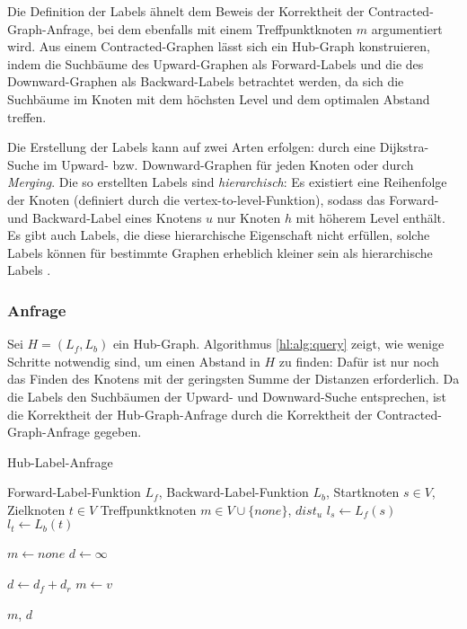 Die Definition der Labels ähnelt dem Beweis der Korrektheit der Contracted-Graph-Anfrage, bei dem ebenfalls mit einem Treffpunktknoten $m$ argumentiert wird.
Aus einem Contracted-Graphen lässt sich ein Hub-Graph konstruieren, indem die Suchbäume des Upward-Graphen als Forward-Labels und die des Downward-Graphen als Backward-Labels betrachtet werden, da sich die Suchbäume im Knoten mit dem höchsten Level und dem optimalen Abstand treffen.

Die Erstellung der Labels kann auf zwei Arten erfolgen: durch eine Dijkstra-Suche im Upward- bzw. Downward-Graphen für jeden Knoten oder durch \emph{Merging}.
Die so erstellten Labels sind \emph{hierarchisch}:
Es existiert eine Reihenfolge der Knoten (definiert durch die vertex-to-level-Funktion), sodass das Forward- und Backward-Label eines Knotens $u$ nur Knoten $h$ mit höherem Level enthält.
Es gibt auch Labels, die diese hierarchische Eigenschaft nicht erfüllen, solche Labels können für bestimmte Graphen erheblich kleiner sein als hierarchische Labels \cite{goldberg2013separating}.

\subsubsection{Anfrage}

Sei $H = (L_f, L_b)$ ein Hub-Graph.
Algorithmus \ref{hl:alg:query} zeigt, wie wenige Schritte notwendig sind, um einen Abstand in $H$ zu finden: Dafür ist nur noch das Finden des Knotens mit der geringsten Summe der Distanzen erforderlich.
Da die Labels den Suchbäumen der Upward- und Downward-Suche entsprechen, ist die Korrektheit der Hub-Graph-Anfrage durch die Korrektheit der Contracted-Graph-Anfrage gegeben.

\begin{algorithm}[ht]
  \caption{Hub-Label-Anfrage}
  \begin{algorithmic}[1]
    \Require Forward-Label-Funktion $L_f$, Backward-Label-Funktion $L_b$, Startknoten $s \in V$, Zielknoten $t \in V$
    \Ensure Treffpunktknoten $m \in V \cup \{ {none} \}$, ${dist}_u$
    \State $l_s \leftarrow L_f (s)$
    \State $l_t \leftarrow L_b (t)$

    \State
    \State $m \leftarrow {none}$
    \State $d \leftarrow \infty$

    \State $d \leftarrow d_f + d_r$
    \State $m \leftarrow v$
    \EndIf
    \EndFor

    \State
    \State \Return $m$, $d$
  \end{algorithmic}
  \label{hl:alg:query}
\end{algorithm}

